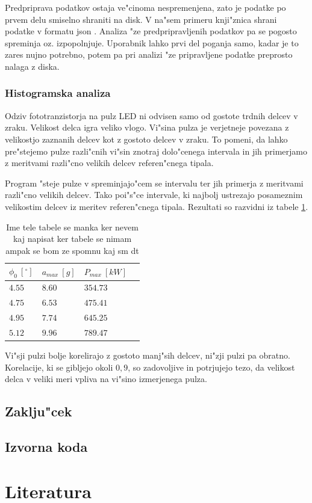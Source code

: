 \documentclass[11pt,a4paper]{article}
\begin{document}
Predpriprava podatkov ostaja ve"cinoma nespremenjena, zato je podatke po prvem delu smiselno shraniti na disk. V na"sem primeru knji"znica shrani podatke v formatu json \cite{json}. Analiza "ze predpripravljenih podatkov pa se pogosto spreminja oz. izpopolnjuje. Uporabnik lahko prvi del poganja samo, kadar je to zares nujno potrebno, potem pa pri analizi "ze pripravljene podatke preprosto nalaga z diska. 

\subsubsection{Histogramska analiza}
Odziv fototranzistorja na pulz LED ni odvisen samo od gostote trdnih delcev v zraku. Velikost delca igra veliko vlogo. Vi"sina pulza je verjetneje povezana z velikostjo zaznanih delcev kot z gostoto delcev v zraku. To pomeni, da lahko pre"stejemo pulze razli"cnih vi"sin znotraj dolo"cenega intervala in jih primerjamo z meritvami razli"cno velikih delcev referen"cnega tipala.

Program "steje pulze v spreminjajo"cem se intervalu ter jih primerja z meritvami razli"cno velikih delcev. Tako poi"s"ce intervale, ki najbolj ustrezajo posameznim velikostim delcev iz meritev referen"cnega tipala. Rezultati so razvidni iz tabele \ref{table:correlations}.


\begin{table}[H]
	\centering
	\begin{tabular}{l|lll}
		$ \phi_0\ [^\circ] $ & $a_{max}\ [g]$ & $ P_{max} \ [kW] $ \\
		\hline
		$ 4.55 $ & $ 8.60 $ & $ 354.73 $ \\
		$ 4.75 $ & $ 6.53 $ & $ 475.41 $ \\
		$ 4.95 $ & $ 7.74 $ & $ 645.25 $ \\
		$ 5.12 $ & $ 9.96 $ & $ 789.47 $
	\end{tabular}
	\caption{Ime tele tabele se manka ker nevem kaj napisat ker tabele se nimam ampak se bom ze spomnu kaj sm dt}
	\label{table:correlations}
	\def\arraystretch{1}
\end{table}

Vi"sji pulzi bolje korelirajo z gostoto manj"sih delcev, ni"zji pulzi pa obratno. Korelacije, ki se gibljejo okoli $0,9$, so zadovoljive in potrjujejo tezo, da velikost delca v veliki meri vpliva na vi"sino izmerjenega pulza.

\clearpage
\subsection{Zaklju"cek}


\clearpage

\begin{appendices}
	\section{Izvorna koda}
\end{appendices}
\clearpage

\section{Literatura}
\printbibliography[heading=none]
\end{document}
